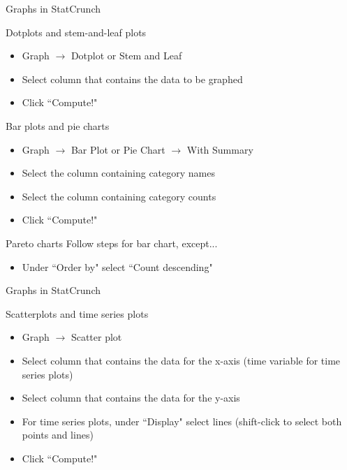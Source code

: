 \documentclass[aspectratio=169]{beamer}
\begin{document}
\begin{frame}{Graphs in StatCrunch}
\begin{block}{Dotplots and stem-and-leaf plots}
\begin{itemize}
\item Graph $\to$ Dotplot or Stem and Leaf
\item Select column that contains the data to be graphed
\item Click ``Compute!"
\end{itemize}
\end{block}

\begin{block}{Bar plots and pie charts}
\begin{itemize}
\item Graph $\to$ Bar Plot or Pie Chart $\to$ With Summary
\item Select the column containing category names
\item Select the column containing category counts
\item Click ``Compute!"
\end{itemize}
\end{block}


\begin{block}{Pareto charts}
Follow steps for bar chart, except...
\begin{itemize}
\item Under ``Order by" select ``Count descending"
\end{itemize}
\end{block}
\end{frame}

\begin{frame}{Graphs in StatCrunch}
\begin{block}{Scatterplots and time series plots}
\begin{itemize}
\item Graph $\to$ Scatter plot
\item Select column that contains the data for the x-axis (time variable for time series plots)
\item Select column that contains the data for the y-axis
\item For time series plots, under ``Display" select lines (shift-click to select both points and lines)
\item Click ``Compute!"
\end{itemize}
\end{block}

\end{frame}
\end{document}
